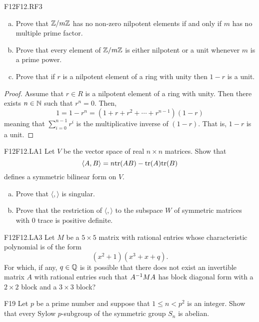 \documentclass[../AlgebraQualSolutions.tex]{subfiles}
\begin{document}
	\begin{prob}{F12}{F12.RF3}
	\begin{enumerate}[(a)]
	\item Prove that $\mathbb{Z}/m\mathbb{Z}$ has no non-zero nilpotent elements if and only if $m$ has no multiple prime factor.
	\item Prove that every element of $\mathbb{Z}/m\mathbb{Z}$ is either nilpotent or a unit whenever $m$ is a prime power.
	\item Prove that if $r$ is a nilpotent element of a ring with unity then $1-r$ is a unit.
	\end{enumerate}
	\end{prob}

	\begin{proof}
		Assume that $r \in R$ is a nilpotent element of a ring with unity. Then there exists $n \in \mathbb{N}$ such that $r^n = 0$. Then,
			\[1 = 1 - r^n = (1 + r + r^2 + \cdots + r^{n-1})(1-r)\]
		meaning that $\sum_{i=0}^{n-1}r^i$ is the multiplicative inverse of $(1-r)$. That is, $1-r$ is a unit.
	\end{proof}
	
	\begin{prob}{F12}{F12.LA1}
	Let $V$ be the vector space of real $n \times n$ matrices. Show that 	
		\[\langle A, B \rangle = n \mathrm{tr}(AB) - \mathrm{tr}(A)\mathrm{tr}(B) \]
	defines a symmetric bilinear form on $V$.
	\begin{enumerate}[(a)]
	\item Prove that $\langle,\rangle$ is singular.
	\item Prove that the restriction of $\langle,\rangle$ to the subspace $W$ of symmetric matrices with 0 trace is positive definite.
	\end{enumerate}
	\end{prob}

	\begin{prob}{F12}{F12.LA3}
	Let $M$ be a $5 \times 5$ matrix with rational entries whose characteristic polynomial is of the form
		\[(x^2+1)(x^3+x+q).\]
	For which, if any, $q \in \mathbb{Q}$ is it possible that there does not exist an invertible matrix $A$ with rational entries such that $A^{-1} M A$ has block diagonal form with a $2 \times 2$ block and a $3 \times 3$ block?
	\end{prob}
	
	\begin{prob}{F19}{}
	Let $p$ be a prime number and suppose that $1 \leq n <p^2$ is an integer. Show that every Sylow $p$-subgroup of the symmetric group $S_n$ is abelian.
	\end{prob}
	
\end{document}
